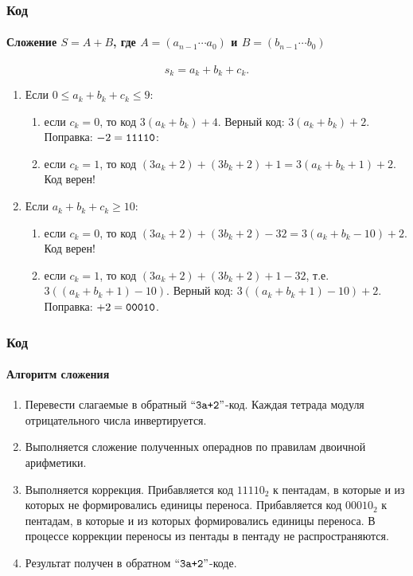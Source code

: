 \begin{frame}
    \frametitle{Код \PentaLabel}
    \framesubtitle{Сложение $S=A+B$, где $A=(a_{n-1}\cdots a_0)$ и $B=(b_{n-1}\cdots b_0)$}

    \[
        s_k=a_k+b_k+c_k.
    \]
    
    \begin{enumerate}
        \item Если $0\leq a_{k}+b_{k}+c_{k}\leq 9$:
        \begin{enumerate}
            \item если $c_{k}=0$, то код $3(a_{k}+b_{k}) + 4$. Верный код: $3(a_{k}+b_{k})+2$. Поправка: $-2=\texttt{11110}$:
            \item если $c_{k}=1$, то код $(3a_k+2)+(3b_{k}+2)+1=3(a_{k}+b_{k}+1)+2$. Код верен!
        \end{enumerate}

        \item Если $a_{k}+b_{k}+c_{k}\geq 10$:
        \begin{enumerate}
            \item если $c_{k}=0$, то код $(3a_{k}+2)+(3b_{k}+2)-32=3(a_{k}+ b_{k}-10)+2$. Код верен!
            \item если $c_{k}=1$, то код $(3a_{k}+2)+(3b_{k}+2)+1-32$, т.е. $3((a_{k}+b_{k}+1)-10)$. Верный код:
            $3((a_{k}+b_{k}+1)-10)+2$. Поправка: $+2=\texttt{00010}$.
        \end{enumerate}
    \end{enumerate}
\end{frame}

\begin{frame}
    \frametitle{Код \PentaLabel}
    \framesubtitle{Алгоритм сложения}
    
    \begin{enumerate}
        \item Перевести слагаемые в обратный $\text{``\texttt{3a+2}''}$-код. Каждая тетрада модуля отрицательного числа инвертируется.
        \item Выполняется сложение полученных операднов по правилам двоичной арифметики.
        \item Выполняется коррекция. Прибавляется код $11110_{2}$ к пентадам, в которые и из которых не формировались единицы переноса. Прибавляется код $00010_{2}$ к пентадам, в которые и из которых формировались единицы переноса. В процессе коррекции переносы из пентады в пентаду не распространяются.
        \item Результат получен в обратном $\text{``\texttt{3a+2}''}$-коде.
    \end{enumerate}
\end{frame}

